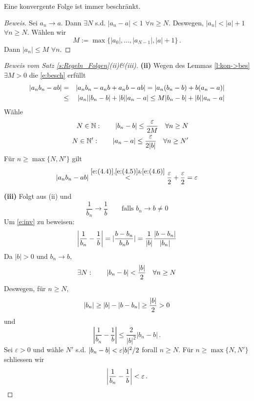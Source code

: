 \begin{Lem}\label{l:kon->bes}
  Eine konvergente Folge ist immer beschränkt.
\end{Lem}
\begin{proof}[Beweis]
Sei $a_n\to a$. Dann $\exists N$ s.d. $|a_n-a|<1$ $\forall n\geq N$.
Deswegen, $|a_n|< |a|+1$ $\forall n\geq N$. W\"ahlen wir
$$
M := \max \{|a_0|, \ldots, |a_{N-1}|, |a|+1\}\, .
$$
Dann $|a_n|\leq M$ $\forall n$.
\end{proof}
\begin{proof}[Beweis vom Satz \ref{s:Regeln_Folgen}(ii)\&(iii)]
{\bf (ii)} Wegen des Lemmas \ref{l:kon->bes} $\exists M>0$ die \eqref{e:besch}
erf\"ullt
  \begin{eqnarray}
\mathopen| a_nb_n-ab \mathclose| &=& \mathopen| a_nb_n-a_nb+a_nb-ab \mathclose|
    = \mathopen| a_n(b_n-b)+b(a_n-a) \mathclose|\nonumber\\
    &\leq& \mathopen| a_n \mathclose|\mathopen| b_n-b \mathclose|+\mathopen| b \mathclose|\mathopen| a_n-a \mathclose|
\leq M\mathopen| b_n-b \mathclose|+\mathopen| b \mathclose|\mathopen| a_n-a \mathclose|\label{e:(4.4)}
\end{eqnarray}
W\"ahle
\begin{eqnarray*}
&&N\in \mathbb{N} : \qquad |b_n-b|\leq \frac{\varepsilon}{2M} \quad \forall n\geq N\label{e:(4.5)}\\
&&N\in \mathbb{N'} : \qquad |a_n-a|\leq \frac{\varepsilon}{2|b|} \quad \forall n\geq N'\label{e:(4.6)}
\end{eqnarray*}
F\"ur $n\geq \max \{N, N'\}$ gilt 
$$
|a_nb_n-ab| \stackrel{\eqref{e:(4.4)},\eqref{e:(4.5)} \& \eqref{e:(4.6)}}{<}
\frac{\varepsilon}{2}+\frac{\varepsilon}{2} = \varepsilon
$$ 

\medskip
{\bf (iii)} Folgt aus (ii) und
\begin{equation}\label{e:inv}
 \frac{1}{b_n}\to\frac{1}{b} \qquad \mbox{falls $b_n\to b\neq 0$}
\end{equation}
Um \eqref{e:inv} zu beweisen:
\begin{equation}\label{e:(4.7)}
\left|\frac{1}{b_n}-\frac{1}{b}\right|
=\mathopen| \frac{b-b_n}{b_nb} \mathclose|
=\frac{1}{\mathopen| b \mathclose|}\frac{\mathopen| b-b_n \mathclose|}{\mathopen| b_n \mathclose|}
\end{equation}
Da $|b|>0$ und $b_n\to b$,
  \[\exists N:\qquad\mathopen| b_n-b \mathclose|<\frac{\mathopen| b \mathclose|}{2}\quad\forall n\geq N\]
Deswegen, f\"ur $n\geq N$,
\begin{equation}\label{e:(4.8)} 
\mathopen| b_n \mathclose|\geq \mathopen| b \mathclose|-\mathopen| b-b_n \mathclose|\geq \frac{\mathopen| b \mathclose|}{2}>0
\end{equation}
und 
$$
\left|\frac{1}{b_n}-\frac{1}{b}\right| \leq \frac{2}{|b|^2} |b_n-b|\, .
$$
Sei $\varepsilon > 0$ und w\"ahle $N'$ s.d. $|b_n-b| < \varepsilon |b|^2/2$ forall
$n\geq N$. F\"ur $n\geq \max\{N, N'\}$ schliessen wir 
$$
\left|\frac{1}{b_n} - \frac{1}{b}\right| < \varepsilon\, .
$$ 
\end{proof}

